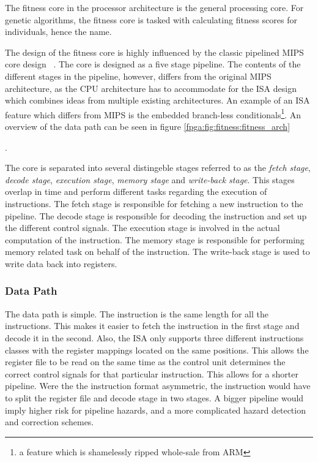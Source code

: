 The fitness core in the processor architecture is the general processing core.
For genetic algorithms, the fitness core is tasked with calculating fitness scores for individuals, hence the name.

The design of the fitness core is highly influenced by the classic pipelined \gls{MIPS} core design ~\cite[p.~362]{compOrgDes}.
The core is designed as a five stage pipeline.
The contents of the different stages in the pipeline, however, differs from the original \gls{MIPS} architecture, as the CPU architecture has to accommodate for the \gls{ISA} design which combines ideas from multiple existing architectures.
An example of an \gls{ISA} feature which differs from \gls{MIPS} is the embedded branch-less conditionals\footnote{a feature which is shamelessly ripped whole-sale from ARM}.
An overview of the data path can be seen in figure \vref{fpga:fig:fitness:fitness_arch}

.


The core is separated into several distingeble stages referred to as the \emph{fetch stage}, \emph{decode stage}, \emph{execution stage}, \emph{memory stage} and \emph{write-back stage}. This stages overlap in time and perform different tasks regarding the execution of instructions. The fetch stage is responsible for fetching a new instruction to the pipeline. The decode stage is responsible for decoding the instruction and set up the different control signals. The execution stage is involved in the actual computation of the instruction. The memory stage is responsible for performing memory related task on behalf of the instruction. The write-back stage is used to write data back into registers.

 
\newpage
\subsubsection{Data Path} 

The data path is simple.
The instruction is the same length for all the instructions.
This makes it easier to fetch the instruction in the first stage and decode it in the second.
Also, the ISA only supports three different instructions classes with the register mappings located on the same positions.
This allows the register file to be read on the same time as the control unit determines the correct control signals for that particular instruction.
This allows for a shorter pipeline.
Were the the instruction format asymmetric, the instruction would have to split the register file and decode stage in two stages.
A bigger pipeline would imply higher risk for pipeline hazards, and a more complicated hazard detection and correction schemes. 

